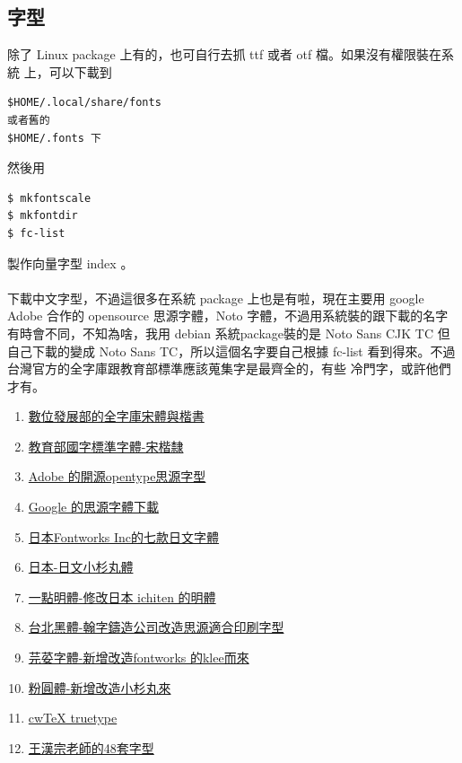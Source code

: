 \subsection{字型}
除了 Linux package 上有的，也可自行去抓 ttf 或者 otf 檔。如果沒有權限裝在系統
上，可以下載到 
\begin{verbatim}
$HOME/.local/share/fonts 
或者舊的
$HOME/.fonts 下
\end{verbatim}
然後用
\begin{verbatim}
$ mkfontscale
$ mkfontdir
$ fc-list
\end{verbatim}
製作向量字型 index 。
\\\\
下載中文字型，不過這很多在系統 package 上也是有啦，現在主要用 google
Adobe 合作的 opensource 思源字體，Noto 字體，不過用系統裝的跟下載的名字
有時會不同，不知為啥，我用 debian 系統package裝的是
Noto Sans CJK TC 但自己下載的變成 Noto Sans TC，所以這個名字要自己根據
fc-list 看到得來。不過台灣官方的全字庫跟教育部標準應該蒐集字是最齊全的，有些
冷門字，或許他們才有。
\begin{enumerate}
\item \href{https://data.gov.tw/dataset/5961}{數位發展部的全字庫宋體與楷書}
\item \href{https://language.moe.gov.tw/result.aspx?classify_sn=23&subclassify_sn=436}{教育部國字標準字體-宋楷隸}
\item \href{https://source.typekit.com/source-han-serif}{Adobe 的開源opentype思源字型}
\item \href{https://fonts.google.com/}{Google 的思源字體下載}
\item \href{https://github.com/fontworks-fonts}{日本Fontworks Inc的七款日文字體}
\item \href{https://github.com/googlefonts/kosugi-maru}{日本-日文小杉丸體}
\item \href{https://github.com/ichitenfont/I.Ming}{一點明體-修改日本 ichiten 的明體}
\item \href{https://sites.google.com/view/jtfoundry/zh-tw}{台北黑體-翰字鑄造公司改造思源適合印刷字型}
\item \href{https://github.com/ButTaiwan/iansui}{芫荽字體-新增改造fontworks 的klee而來}
\item \href{https://github.com/justfont/open-huninn-font}{粉圓體-新增改造小杉丸來}
\item \href{https://github.com/l10n-tw/cwtex-q-fonts}{cwTeX truetype}
\item \href{https://code.google.com/archive/p/wangfonts/}{王漢宗老師的48套字型}
\end{enumerate}

